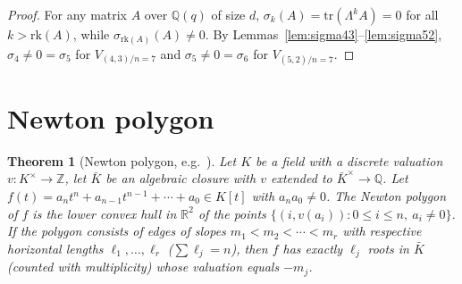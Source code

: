 \documentclass[11pt]{article}
\theoremstyle{plain}
\newtheorem{theorem}{Theorem}
\theoremstyle{definition}
\theoremstyle{remark}
\newcommand{\Z}{\mathbb{Z}}
\newcommand{\Q}{\mathbb{Q}}
\newcommand{\trace}{\mathrm{tr}}
\newcommand{\rk}{\mathrm{rk}}
\begin{document}
\begin{proof}
For any matrix $A$ over $\Q(q)$ of size $d$, $\sigma_k(A) = \trace(\Lambda^k A) = 0$
for all $k > \rk(A)$, while $\sigma_{\rk(A)}(A) \neq 0$.  By
Lemmas~\ref{lem:sigma43}--\ref{lem:sigma52}, $\sigma_4 \neq 0 = \sigma_5$ for
$V_{(4,3)/n=7}$ and $\sigma_5 \neq 0 = \sigma_6$ for $V_{(5,2)/n=7}$.
\end{proof}

\section{Newton polygon}

\begin{theorem}[Newton polygon, e.g.\ {\cite[Ch.~II,~Prop.~6.3]{Neukirch}}]
\label{thm:newton}
Let $K$ be a field with a discrete valuation $v \colon K^\times \to \Z$, let $\bar{K}$
be an algebraic closure with $v$ extended to $\bar K^\times \to \Q$.
Let $f(t) = a_n t^n + a_{n-1} t^{n-1} + \cdots + a_0 \in K[t]$ with $a_n a_0 \neq 0$.
The \emph{Newton polygon} of $f$ is the lower convex hull in $\mathbb{R}^2$ of the
points $\{(i, v(a_i)) : 0 \leq i \leq n,\ a_i \neq 0\}$.  If the polygon consists
of edges of slopes $m_1 < m_2 < \cdots < m_r$ with respective horizontal lengths
$\ell_1, \ldots, \ell_r$ ($\sum \ell_j = n$), then $f$ has exactly $\ell_j$ roots
in $\bar K$ (counted with multiplicity) whose valuation equals $-m_j$.
\end{theorem}
\end{document}

